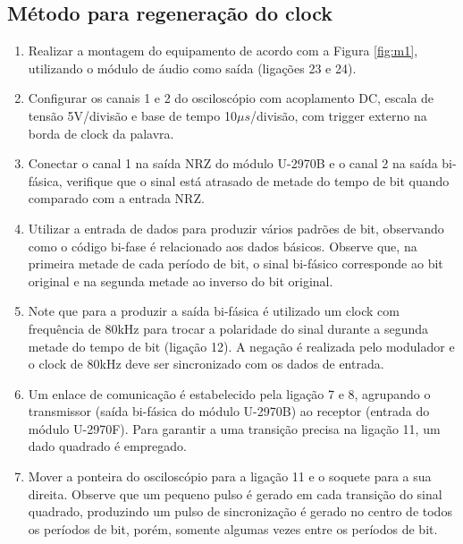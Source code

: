     \subsection{Método para regeneração do clock}
        \begin{enumerate}
                \item Realizar a montagem do equipamento de acordo com a Figura \ref{fig:m1}, utilizando o módulo de áudio como saída (ligações 23 e 24).
                
                \item Configurar os canais 1 e 2 do osciloscópio com acoplamento DC, escala de tensão 5V/divisão e base de tempo  10$\mu s$/divisão, com trigger externo na borda de clock da palavra.
                
                \item Conectar o canal 1 na saída NRZ do módulo U-2970B e o canal 2 na saída bi-fásica, verifique que o sinal está atrasado de metade do tempo de bit quando comparado com a entrada NRZ.
                
                \item Utilizar a entrada de dados para produzir vários padrões de bit, observando como o código bi-fase é relacionado aos dados básicos. Observe que, na primeira metade de cada período  de bit, o sinal bi-fásico corresponde ao bit original e na segunda metade ao inverso do bit original.
                
                \item Note que para a produzir a saída bi-fásica é utilizado um clock com frequência de 80kHz para trocar a polaridade do sinal durante a segunda metade do tempo de bit (ligação 12). A negação é realizada pelo modulador e o clock de 80kHz deve ser sincronizado com os dados de entrada.
                
                \item Um enlace de comunicação é estabelecido pela ligação 7 e 8, agrupando o transmissor (saída bi-fásica do módulo U-2970B) ao receptor (entrada do módulo U-2970F). Para garantir a uma transição precisa na ligação 11, um dado quadrado é empregado.
                                
                \item Mover a ponteira do osciloscópio para a ligação 11 e o soquete para a sua direita. Observe que um pequeno pulso é gerado em cada transição do sinal quadrado, produzindo um pulso de sincronização é gerado no centro de todos os períodos de bit, porém, somente algumas vezes entre os períodos de bit.
            \end{enumerate}
            
